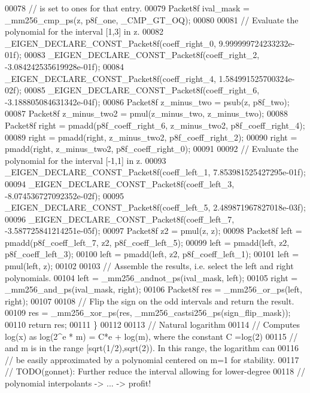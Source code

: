 \begin{DoxyCode}
00078   \textcolor{comment}{// is set to ones for that entry.}
00079   Packet8f ival\_mask = \_mm256\_cmp\_ps(z, p8f\_one, \_CMP\_GT\_OQ);
00080 
00081   \textcolor{comment}{// Evaluate the polynomial for the interval [1,3] in z.}
00082   \_EIGEN\_DECLARE\_CONST\_Packet8f(coeff\_right\_0, 9.999999724233232e-01f);
00083   \_EIGEN\_DECLARE\_CONST\_Packet8f(coeff\_right\_2, -3.084242535619928e-01f);
00084   \_EIGEN\_DECLARE\_CONST\_Packet8f(coeff\_right\_4, 1.584991525700324e-02f);
00085   \_EIGEN\_DECLARE\_CONST\_Packet8f(coeff\_right\_6, -3.188805084631342e-04f);
00086   Packet8f z\_minus\_two = psub(z, p8f\_two);
00087   Packet8f z\_minus\_two2 = pmul(z\_minus\_two, z\_minus\_two);
00088   Packet8f right = pmadd(p8f\_coeff\_right\_6, z\_minus\_two2, p8f\_coeff\_right\_4);
00089   right = pmadd(right, z\_minus\_two2, p8f\_coeff\_right\_2);
00090   right = pmadd(right, z\_minus\_two2, p8f\_coeff\_right\_0);
00091 
00092   \textcolor{comment}{// Evaluate the polynomial for the interval [-1,1] in z.}
00093   \_EIGEN\_DECLARE\_CONST\_Packet8f(coeff\_left\_1, 7.853981525427295e-01f);
00094   \_EIGEN\_DECLARE\_CONST\_Packet8f(coeff\_left\_3, -8.074536727092352e-02f);
00095   \_EIGEN\_DECLARE\_CONST\_Packet8f(coeff\_left\_5, 2.489871967827018e-03f);
00096   \_EIGEN\_DECLARE\_CONST\_Packet8f(coeff\_left\_7, -3.587725841214251e-05f);
00097   Packet8f z2 = pmul(z, z);
00098   Packet8f left = pmadd(p8f\_coeff\_left\_7, z2, p8f\_coeff\_left\_5);
00099   left = pmadd(left, z2, p8f\_coeff\_left\_3);
00100   left = pmadd(left, z2, p8f\_coeff\_left\_1);
00101   left = pmul(left, z);
00102 
00103   \textcolor{comment}{// Assemble the results, i.e. select the left and right polynomials.}
00104   left = \_mm256\_andnot\_ps(ival\_mask, left);
00105   right = \_mm256\_and\_ps(ival\_mask, right);
00106   Packet8f res = \_mm256\_or\_ps(left, right);
00107 
00108   \textcolor{comment}{// Flip the sign on the odd intervals and return the result.}
00109   res = \_mm256\_xor\_ps(res, \_mm256\_castsi256\_ps(sign\_flip\_mask));
00110   \textcolor{keywordflow}{return} res;
00111 \}
00112 
00113 \textcolor{comment}{// Natural logarithm}
00114 \textcolor{comment}{// Computes log(x) as log(2^e * m) = C*e + log(m), where the constant C =log(2)}
00115 \textcolor{comment}{// and m is in the range [sqrt(1/2),sqrt(2)). In this range, the logarithm can}
00116 \textcolor{comment}{// be easily approximated by a polynomial centered on m=1 for stability.}
00117 \textcolor{comment}{// TODO(gonnet): Further reduce the interval allowing for lower-degree}
00118 \textcolor{comment}{//               polynomial interpolants -> ... -> profit!}

\end{DoxyCode}
